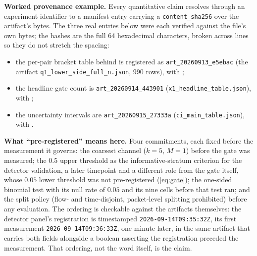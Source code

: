 \documentclass[sigconf,anonymous,review]{acmart}
\begin{document}
\textbf{Worked provenance example.}
Every quantitative claim resolves through an experiment identifier to a manifest
entry carrying a \texttt{content\_sha256} over the artifact's bytes. The three
real entries below were each verified against the file's own bytes; the hashes
are the full 64 hexadecimal characters, broken across lines so they do not
stretch the spacing:
\begin{itemize}
  \item the per-pair bracket table behind  is registered as
  \texttt{art\_20260913\_e5ebac} (the artifact
  \texttt{q1\_lower\_side\_full\_n.json}, 990 rows), with
  \texttt{};
  \item the headline gate count is \texttt{art\_20260914\_443901}
  (\texttt{x1\_headline\_table.json}), with
  \texttt{};
  \item the uncertainty intervals are \texttt{art\_20260915\_27333a}
  (\texttt{ci\_main\_table.json}), with
  \texttt{}.
\end{itemize}

\textbf{What ``pre-registered'' means here.}
Four commitments, each fixed before the measurement it governs: the coarsest
channel ($k{=}5$, $M{=}1$) before the gate was measured; the $0.5$ upper
threshold as the informative-stratum criterion for the detector validation, a
later timepoint and a different role from the gate itself, whose $0.05$ lower
threshold was not pre-registered
(\eqref{eq:gate}); the one-sided binomial test with its null rate of
$0.05$ and its nine cells before that test ran; and the split policy (flow- and
time-disjoint, packet-level splitting prohibited) before any evaluation. The
ordering is checkable against the artifacts themselves: the detector panel's
registration is timestamped
\nolinkurl{2026-09-14T09:35:32Z}, its first measurement
\nolinkurl{2026-09-14T09:36:33Z}, one minute later, in the same artifact that
carries both fields alongside a boolean asserting the registration preceded the
measurement. That ordering, not the word itself, is the claim.
\end{document}
